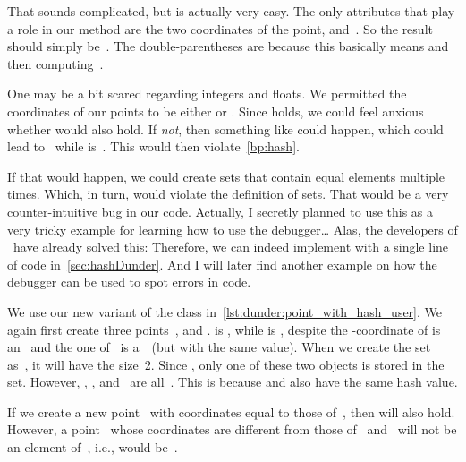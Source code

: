 %
That sounds complicated, but is actually very easy.
The only attributes that play a role in our  method are the two coordinates of the point,  and~.
So the result~ should simply be~.
The double-parentheses are because this basically means  and then computing~.%
%
\begin{sloppypar}%
One may be a bit scared regarding integers and floats.
We permitted the coordinates of our points to be either  or .
Since  holds, we could feel anxious whether  would also hold.
If \emph{not}, then something like  could happen, which could lead to~ while  is~.
This would then violate~\cref{bp:hash}.%
\end{sloppypar}%
%
If that would happen, we could create sets that contain equal elements multiple times.
Which, in turn, would violate the definition of sets.
That would be a very counter-intuitive bug in our code.
Actually, I secretly planned to use this as a very tricky example for learning how to use the debugger{\dots}
Alas, the developers of \python\ have already solved this:%
%
%
%
Therefore, we can indeed implement  with a single line of code in~\cref{sec:hashDunder}.
And I will later find another example on how the debugger can be used to spot errors in code.%
%
\begin{sloppypar}%
We use our new variant of the  class in~\cref{lst:dunder:point_with_hash_user}.
We again first create three points~,  and .
 is , while  is , despite the \nobreakdashes-coordinate of  is an~ and the one of~ is a~~(but with the same value).
When we create the set~ as~, it will have the size~2.
Since , only one of these two objects is stored in the set.
However, , , and~ are all~.
This is because  and  also have the same hash value.%
\end{sloppypar}%
%
If we create a new point~ with coordinates equal to those of~, then  will also hold.
However, a point~ whose coordinates are different from those of~ and~ will not be an element of~, i.e.,  would be~.

